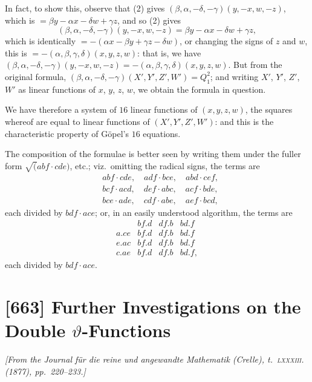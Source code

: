 \documentclass[11pt,a4paper]{book}
\begin{document}
In fact, to show this, observe that (2) gives $(\beta, \alpha, -\delta, -\gamma)(y, -x, w, -z)$, which is $= \beta y - \alpha x - \delta w + \gamma z$, and so (2) gives
\[
(\beta, \alpha, -\delta, -\gamma)(y, -x, w, -z) = \beta y - \alpha x - \delta w + \gamma z,
\]
which is identically $= -(\alpha x - \beta y + \gamma z - \delta w)$, or changing the signs of $z$ and $w$, this is $= -(\alpha, \beta, \gamma, \delta)(x, y, z, w)$: that is, we have $(\beta, \alpha, -\delta, -\gamma)(y, -x, w, -z) = -(\alpha, \beta, \gamma, \delta)(x, y, z, w)$. But from the original formula, $(\beta, \alpha, -\delta, -\gamma)(X', Y', Z', W') = Q_1^2$; and writing $X'$, $Y'$, $Z'$, $W'$ as linear functions of $x$, $y$, $z$, $w$, we obtain the formula in question.

We have therefore a system of $16$ linear functions of $(x, y, z, w)$, the squares whereof are equal to linear functions of $(X', Y', Z', W')$: and this is the characteristic property of G\"{o}pel's $16$ equations.

The composition of the formulae is better seen by writing them under the fuller form $\surd(abf \cdot cde)$, etc.; viz.~omitting the radical signs, the terms are
\begin{align*}
& abf \cdot cde, \quad adf \cdot bce, \quad abd \cdot cef, \\
& bcf \cdot acd, \quad def \cdot abc, \quad acf \cdot bde, \\
& bce \cdot ade, \quad cdf \cdot abe, \quad aef \cdot bcd,
\end{align*}
each divided by $bdf \cdot ace$; or, in an easily understood algorithm, the terms are
\[
\begin{array}{c|ccc}
& bf.d & df.b & bd.f \\ \hline
a.ce & bf.d & df.b & bd.f \\
e.ac & bf.d & df.b & bd.f \\
c.ae & bf.d & df.b & bd.f,
\end{array}
\]
each divided by $bdf \cdot ace$.

\newpage
\section{[663] Further Investigations on the Double $\vartheta$-Functions}
\label{sec:663}

\noindent\textit{[From the \emph{Journal f\"ur die reine und angewandte Mathematik} (Crelle), t.~\textsc{lxxxiii}. (1877), pp.~220--233.]}
\end{document}
